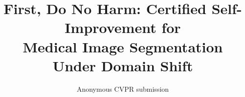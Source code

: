 \documentclass[10pt,twocolumn,letterpaper]{article}
\title{First, Do No Harm: Certified Self-Improvement for\\Medical Image Segmentation Under Domain Shift}
\author{Anonymous CVPR submission}
\begin{document}
\maketitle








\clearpage


{
    \small
    
    
}
\end{document}
